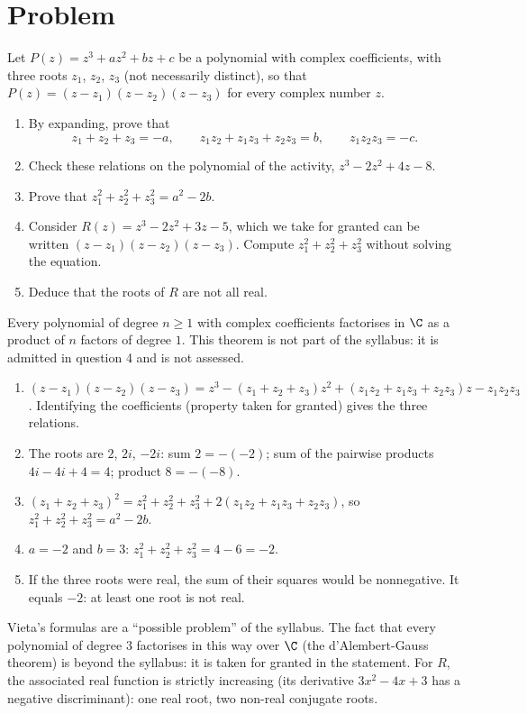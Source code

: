 \mxnewpage
\section{Problem}
\begin{problem}
Let $P(z)=z^3+az^2+bz+c$ be a polynomial with complex coefficients, with three roots $z_1$, $z_2$, $z_3$ (not necessarily distinct), so that $P(z)=(z-z_1)(z-z_2)(z-z_3)$ for every complex number $z$.
\begin{enumerate}
\item By expanding, prove that
\[z_1+z_2+z_3=-a,\qquad z_1z_2+z_1z_3+z_2z_3=b,\qquad z_1z_2z_3=-c.\]
\item Check these relations on the polynomial of the activity, $z^3-2z^2+4z-8$.
\item Prove that $z_1^2+z_2^2+z_3^2=a^2-2b$.
\item Consider $R(z)=z^3-2z^2+3z-5$, which we take for granted can be written $(z-z_1)(z-z_2)(z-z_3)$. Compute $z_1^2+z_2^2+z_3^2$ without solving the equation.
\item Deduce that the roots of $R$ are not all real.
\end{enumerate}
\end{problem}
\begin{beyond}Every polynomial of degree $n\ge1$ with complex coefficients factorises in $\C$ as a product of $n$ factors of degree $1$. This theorem is not part of the syllabus: it is admitted in question 4 and is not assessed.\end{beyond}
\begin{solution}[Problem]
\begin{enumerate}
\item $(z-z_1)(z-z_2)(z-z_3)=z^3-(z_1+z_2+z_3)z^2+(z_1z_2+z_1z_3+z_2z_3)z-z_1z_2z_3$. Identifying the coefficients (property taken for granted) gives the three relations.
\item The roots are $2$, $2i$, $-2i$: sum $2=-(-2)$; sum of the pairwise products $4i-4i+4=4$; product $8=-(-8)$.
\item $(z_1+z_2+z_3)^2=z_1^2+z_2^2+z_3^2+2(z_1z_2+z_1z_3+z_2z_3)$, so $z_1^2+z_2^2+z_3^2=a^2-2b$.
\item $a=-2$ and $b=3$: $z_1^2+z_2^2+z_3^2=4-6=-2$.
\item If the three roots were real, the sum of their squares would be nonnegative. It equals $-2$: at least one root is not real.
\end{enumerate}
\end{solution}
\begin{teachernote}
Vieta's formulas are a ``possible problem'' of the syllabus. The fact that every polynomial of degree $3$ factorises in this way over $\C$ (the d'Alembert-Gauss theorem) is beyond the syllabus: it is taken for granted in the statement. For $R$, the associated real function is strictly increasing (its derivative $3x^2-4x+3$ has a negative discriminant): one real root, two non-real conjugate roots.
\end{teachernote}
